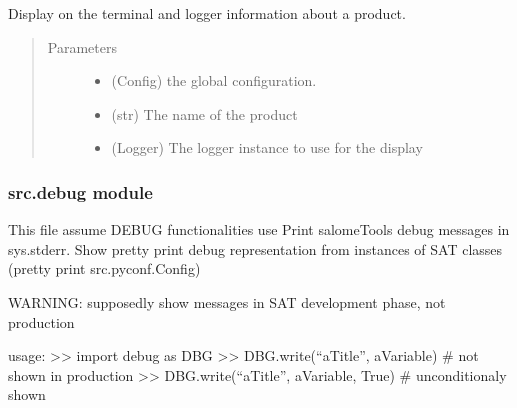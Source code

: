 \documentclass[a4paper,10pt,english]{sphinxmanual}
\begin{document}

\begin{fulllineitems}
\label{\detokenize{apidoc_src/src:src.configManager.show_product_info}}
Display on the terminal and logger information about a product.
\begin{quote}\begin{description}
\item[{Parameters}] \leavevmode\begin{itemize}
\item {} 
 \textendash{} (Config) the global configuration.

\item {} 
 \textendash{} (str) The name of the product

\item {} 
 \textendash{} (Logger) The logger instance to use for the display

\end{itemize}

\end{description}\end{quote}

\end{fulllineitems}



\subsubsection{src.debug module}
\label{\detokenize{apidoc_src/src:module-src.debug}}\label{\detokenize{apidoc_src/src:src-debug-module}}
This file assume DEBUG functionalities use
Print salomeTools debug messages in sys.stderr.
Show pretty print debug representation from instances of SAT classes 
(pretty print src.pyconf.Config)

WARNING: supposedly show messages in SAT development phase, not production

usage:
\textgreater{}\textgreater{} import debug as DBG
\textgreater{}\textgreater{} DBG.write(“aTitle”, aVariable)        \# not shown in production 
\textgreater{}\textgreater{} DBG.write(“aTitle”, aVariable, True)  \# unconditionaly shown
\end{document}

